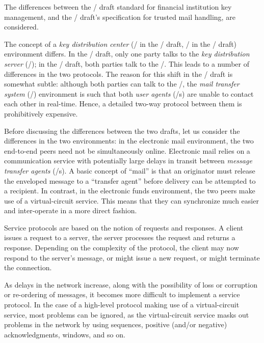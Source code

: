 

The differences between the \ansi/ draft standard for
financial institution key management,
and the \TTI/ draft's specification for trusted mail handling,
are considered.

The concept of a {\it key distribution center}
(\CKD/ in the \ansi/ draft, \KDC/ in the \TTI/ draft)
environment differs.
In the \ansi/ draft,
only one party talks to the {\it key distribution server} (\KDS/);
in the \TTI/ draft,
both parties talk to the \KDS/.
This leads to a number of differences in the two protocols.
The reason for this shift in the \TTI/ draft is somewhat subtle:
although both parties can talk to the \KDS/,
the {\it mail transfer system} (\MTS/)
environment is such that both {\it user agents} (\UA/s) are unable to
contact each other in real-time.
Hence, a detailed two-way protocol between them is prohibitively expensive.%

Before discussing the differences between the two drafts,
let us consider the differences in the two environments:
in the electronic mail environment,
the two end-to-end peers need not be simultaneously online.
Electronic mail relies on a communication service with potentially large
delays in transit between {\it message transfer agents} (\MTA/s).
A basic concept of ``mail'' is that an originator must release the enveloped
message to a ``transfer agent'' before delivery can be attempted to a
recipient.
In contrast,
in the electronic funds environment,
the two peers make use of a virtual-circuit service.
This means that they can synchronize much easier
and inter-operate in a more direct fashion.

Service protocols are based on the notion of requests and responses.
A client issues a request to a server,
the server processes the request and returns a response.
Depending on the complexity of the protocol,
the client may now respond to the server's message,
or might issue a new request,
or might terminate the connection.

As delays in the network increase,
along with the possibility of loss or corruption or re-ordering of messages,
it becomes more difficult to implement a service protocol.
In the case of a high-level protocol making use of a virtual-circuit service,
most problems can be ignored,
as the virtual-circuit service masks out problems in the network
by using sequences, positive (and/or negative) acknowledgments, windows,
and so on.

